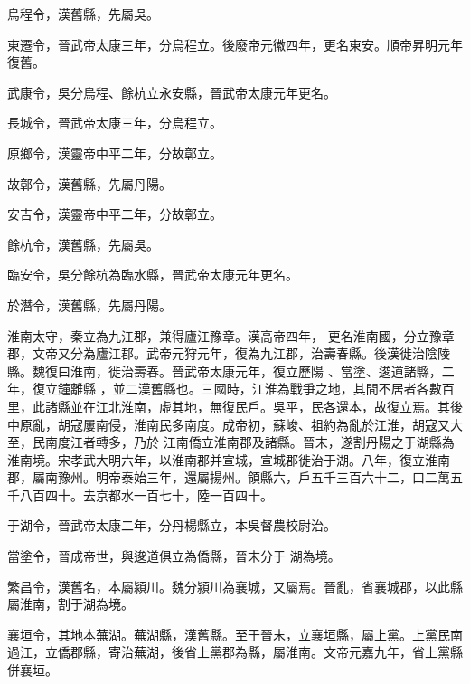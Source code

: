 \begin{pinyinscope}
 烏程令，漢舊縣，先屬吳。



 東遷令，晉武帝太康三年，分烏程立。後廢帝元徽四年，更名東安。順帝昇明元年復舊。



 武康令，吳分烏程、餘杭立永安縣，晉武帝太康元年更名。



 長城令，晉武帝太康三年，分烏程立。



 原鄉令，漢靈帝中平二年，分故鄣立。



 故鄣令，漢舊縣，先屬丹陽。



 安吉令，漢靈帝中平二年，分故鄣立。



 餘杭令，漢舊縣，先屬吳。



 臨安令，吳分餘杭為臨水縣，晉武帝太康元年更名。



 於潛令，漢舊縣，先屬丹陽。


淮南太守，秦立為九江郡，兼得廬江豫章。漢高帝四年，
 更名淮南國，分立豫章郡，文帝又分為廬江郡。武帝元狩元年，復為九江郡，治壽春縣。後漢徙治陰陵縣。魏復曰淮南，徙治壽春。晉武帝太康元年，復立歷陽
 、當塗、逡道諸縣，二年，復立鐘離縣
 ，並二漢舊縣也。三國時，江淮為戰爭之地，其間不居者各數百里，此諸縣並在江北淮南，虛其地，無復民戶。吳平，民各還本，故復立焉。其後中原亂，胡寇屢南侵，淮南民多南度。成帝初，蘇峻、祖約為亂於江淮，胡寇又大至，民南度江者轉多，乃於
 江南僑立淮南郡及諸縣。晉末，遂割丹陽之于湖縣為淮南境。宋孝武大明六年，以淮南郡并宣城，宣城郡徙治于湖。八年，復立淮南郡，屬南豫州。明帝泰始三年，還屬揚州。領縣六，戶五千三百六十二，口二萬五千八百四十。去京都水一百七十，陸一百四十。



 于湖令，晉武帝太康二年，分丹楊縣立，本吳督農校尉治。



 當塗令，晉成帝世，與逡道俱立為僑縣，晉末分于
 湖為境。



 繁昌令，漢舊名，本屬潁川。魏分潁川為襄城，又屬焉。晉亂，省襄城郡，以此縣屬淮南，割于湖為境。



 襄垣令，其地本蕪湖。蕪湖縣，漢舊縣。至于晉末，立襄垣縣，屬上黨。上黨民南過江，立僑郡縣，寄治蕪湖，後省上黨郡為縣，屬淮南。文帝元嘉九年，省上黨縣併襄垣。




\end{pinyinscope}
